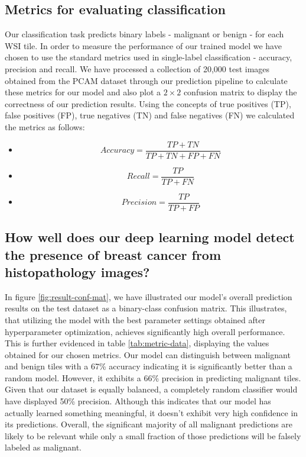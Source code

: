 \documentclass{l4proj}
\begin{document}
\subsection{Metrics for evaluating classification}
Our classification task predicts binary labels - malignant or benign - for each WSI tile. In order to measure the performance of our trained model we have chosen to use the standard metrics used in single-label classification - accuracy, precision and recall. We have processed a collection of 20,000 test images obtained from the PCAM dataset through our prediction pipeline to calculate these metrics for our model and also plot a \(2 \times 2\) confusion matrix to display the correctness of our prediction results. Using the concepts of true positives (TP), false positives (FP), true negatives (TN) and false negatives (FN) we calculated the metrics as follows:
\begin{itemize}
    \item \begin{equation}
        Accuracy = \frac{TP + TN}{TP + TN + FP + FN}
    \end{equation}

    \item \begin{equation}
        Recall = \frac{TP}{TP + FN}
    \end{equation}

    \item \begin{equation}
        Precision = \frac{TP}{TP + FP}
    \end{equation}
\end{itemize}

\subsection{How well does our deep learning model detect the presence of breast cancer from histopathology images?}
In figure \ref{fig:result-conf-mat}, we have illustrated our model's overall prediction results on the test dataset as a binary-class confusion matrix. This illustrates, that utilizing the model with the best parameter settings obtained after hyperparameter optimization, achieves significantly high overall performance. This is further evidenced in table \ref{tab:metric-data}, displaying the values obtained for our chosen metrics. Our model can distinguish between malignant and benign tiles with a 67\% accuracy indicating it is significantly better than a random model. However, it exhibits a 66\% precision in predicting malignant tiles. Given that our dataset is equally balanced, a completely random classifier would have displayed 50\% precision. Although this indicates that our model has actually learned something meaningful, it doesn't exhibit very high confidence in its predictions. Overall, the significant majority of all malignant predictions are likely to be relevant while only a small fraction of those predictions will be falsely labeled as malignant.
\end{document}
